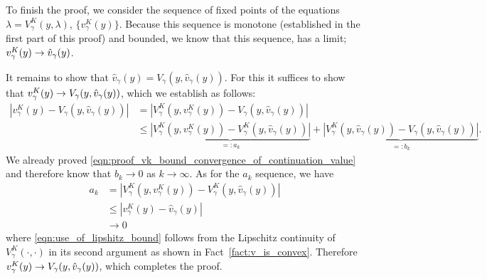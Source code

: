 \begin{myproof}[Proof.]
	{\color{blue}
	To finish the proof, we consider the sequence of fixed points of the equations $\lambda = V^K_\gamma(y, \lambda)$, $\{v^K_\gamma(y)\}$. 
	Because this sequence is monotone (established in the first part of this proof) and bounded, we know that this sequence, has a limit; $v^K_\gamma(y) \rightarrow \hat v_\gamma(y)$. 	

It remains to show that $\hat v_\gamma(y) = V_\gamma(y, \hat v_\gamma(y))$. For this it suffices to show that $v^K_\gamma(y) \rightarrow V_\gamma(y, \hat v_\gamma(y))$, which we establish as follows: 
%	
	\begin{align*}
	|v^K_\gamma(y) - V_\gamma(y, \hat v_\gamma(y))| &  = |V^K_\gamma(y, v^K_\gamma(y)) - V_\gamma(y, \hat v_\gamma(y)) | \\
	&  \leq \underbrace{|V^K_\gamma(y, v^K_\gamma(y)) - V^K_\gamma(y, \hat v_\gamma(y))|}_{=: a_k} + \underbrace{|V^K_\gamma(y, \hat v_\gamma(y)) - V_\gamma(y, \hat v_\gamma(y))|}_{=:b_k}.
	\end{align*}
	We already proved \eqref{eqn:proof_vk_bound_convergence_of_continuation_value} and therefore know that $b_k \to 0$ as $k \to \infty$. As for the $a_k$ sequence, we have
	\begin{align}
	a_k & = |V^K_\gamma(y, v^K_\gamma(y)) - V^K_\gamma(y, \hat v_\gamma(y))| \nonumber \\
	& \leq | v^K_\gamma(y) - \hat v_\gamma(y) | \label{eqn:use_of_lipshitz_bound}\\
	&  \to 0 \nonumber
	\end{align}
	where \eqref{eqn:use_of_lipshitz_bound} follows from the Lipschitz continuity of $V^K_\gamma(\cdot, \cdot)$ in its second argument as shown in Fact~\ref{fact:v_is_convex}. Therefore $v^K_\gamma(y) \rightarrow V_\gamma(y, \hat v_\gamma(y))$, which completes the proof. 	
	}
\end{myproof}


